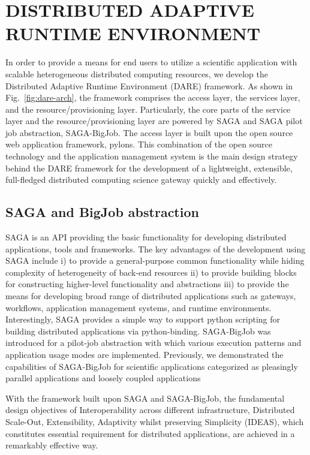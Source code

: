 \documentclass{sig-alternate}
\begin{document}
\section{DISTRIBUTED ADAPTIVE RUNTIME ENVIRONMENT}
In order to provide a means for end users to utilize a scientific application with scalable heterogeneous distributed computing resources, we develop the Distributed Adaptive Runtime Environment (DARE) framework\cite{dareurl}.  As shown in Fig.~\ref{fig:dare-arch}, the framework comprises the access layer, the services layer, and the resource/provisioning layer.  Particularly, the core parts of the service layer and the resource/provisioning layer are powered by SAGA and SAGA pilot job abstraction, SAGA-BigJob\cite{saga-ccgrid10,saga-royalsoc,saga-web,jha2009developing,ecmls10, ecmls11}.  The access layer is built upon the open source web application framework, pylons\cite{pylonsurl}.  This combination of the open source technology and the application management system is the main design strategy behind the DARE framework for the development of a lightweight, extensible, full-fledged distributed computing science gateway quickly and effectively\cite{pylonsurl}. 

\subsection{SAGA and BigJob abstraction}
SAGA is an API providing the basic functionality for developing distributed applications, tools and frameworks\cite{saga-web}. The key advantages of the development using SAGA include i) to provide a general-purpose common functionality while hiding complexity of heterogeneity of back-end resources ii) to provide building blocks for constructing higher-level functionality and abstractions iii) to provide the means for developing broad range of distributed applications such as gateways, workflows, application management systems, and runtime environments.   Interestingly, SAGA provides a simple way to support python scripting for building distributed applications via python-binding.  SAGA-BigJob was introduced for a pilot-job abstraction with which various execution patterns and application usage modes are implemented.  Previously, we demonstrated the capabilities of SAGA-BigJob for scientific applications categorized as pleasingly parallel applications and loosely coupled applications\cite{saga-royalsoc,jha2009developing, ecmls10}

With the framework built upon SAGA and SAGA-BigJob, the fundamental design objectives of Interoperability across different infrastructure, Distributed Scale-Out, Extensibility, Adaptivity whilst preserving Simplicity (IDEAS), which constitutes essential requirement for distributed applications, are achieved in a remarkably effective way.
\end{document}
